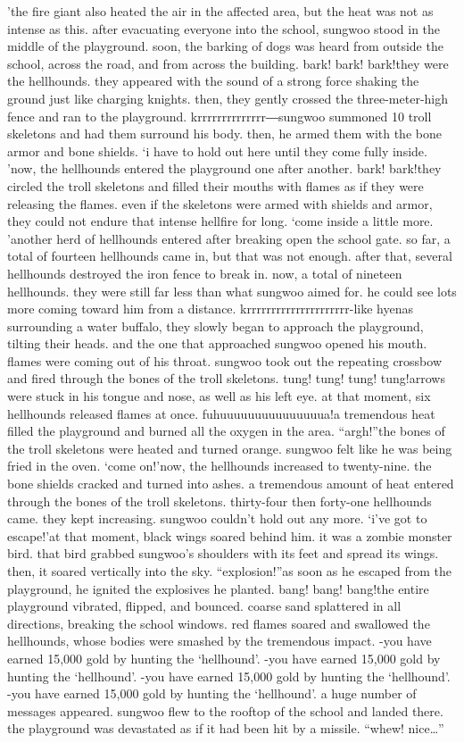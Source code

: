 ’the fire giant also heated the air in the affected area, but the heat was not as intense as this.
after evacuating everyone into the school, sungwoo stood in the middle of the playground.
soon, the barking of dogs was heard from outside the school, across the road, and from across the building.
bark! bark! bark!they were the hellhounds.
 they appeared with the sound of a strong force shaking the ground just like charging knights.
 then, they gently crossed the three-meter-high fence and ran to the playground.
krrrrrrrrrrrrrr―sungwoo summoned 10 troll skeletons and had them surround his body.
 then, he armed them with the bone armor and bone shields.
‘i have to hold out here until they come fully inside.
’now, the hellhounds entered the playground one after another.
bark! bark!they circled the troll skeletons and filled their mouths with flames as if they were releasing the flames.
 even if the skeletons were armed with shields and armor, they could not endure that intense hellfire for long.
‘come inside a little more.
’another herd of hellhounds entered after breaking open the school gate.
 so far, a total of fourteen hellhounds came in, but that was not enough.
 after that, several hellhounds destroyed the iron fence to break in.
 now, a total of nineteen hellhounds.
 they were still far less than what sungwoo aimed for.
 he could see lots more coming toward him from a distance.
krrrrrrrrrrrrrrrrrrrrr-like hyenas surrounding a water buffalo, they slowly began to approach the playground, tilting their heads.
and the one that approached sungwoo opened his mouth.
 flames were coming out of his throat.
 sungwoo took out the repeating crossbow and fired through the bones of the troll skeletons.
tung! tung! tung! tung!arrows were stuck in his tongue and nose, as well as his left eye.
 at that moment, six hellhounds released flames at once.
fuhuuuuuuuuuuuuuuua!a tremendous heat filled the playground and burned all the oxygen in the area.
“argh!”the bones of the troll skeletons were heated and turned orange.
 sungwoo felt like he was being fried in the oven.
‘come on!’now, the hellhounds increased to twenty-nine.
the bone shields cracked and turned into ashes.
a tremendous amount of heat entered through the bones of the troll skeletons.
thirty-four then forty-one hellhounds came.
 they kept increasing.
sungwoo couldn’t hold out any more.
‘i’ve got to escape!’at that moment, black wings soared behind him.
 it was a zombie monster bird.
 that bird grabbed sungwoo’s shoulders with its feet and spread its wings.
 then, it soared vertically into the sky.
“explosion!”as soon as he escaped from the playground, he ignited the explosives he planted.
bang! bang! bang!the entire playground vibrated, flipped, and bounced.
 coarse sand splattered in all directions, breaking the school windows.
 red flames soared and swallowed the hellhounds, whose bodies were smashed by the tremendous impact.
-you have earned 15,000 gold by hunting the ‘hellhound’.
-you have earned 15,000 gold by hunting the ‘hellhound’.
-you have earned 15,000 gold by hunting the ‘hellhound’.
-you have earned 15,000 gold by hunting the ‘hellhound’.
a huge number of messages appeared.
 sungwoo flew to the rooftop of the school and landed there.
 the playground was devastated as if it had been hit by a missile.
“whew! nice…”

